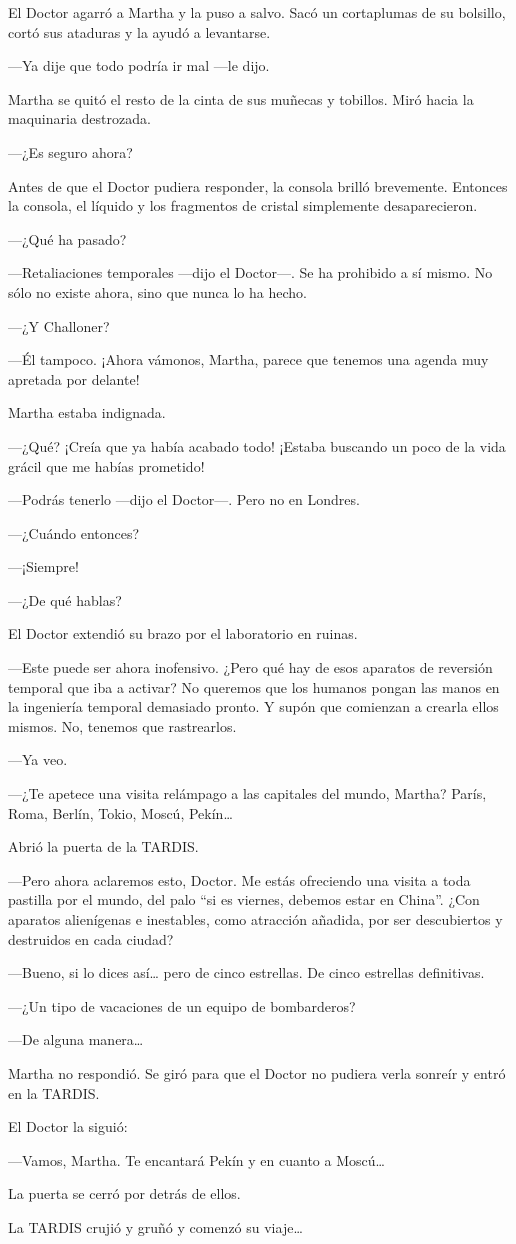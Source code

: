 El Doctor agarró a Martha y la puso a salvo. Sacó un cortaplumas de su
bolsillo, cortó sus ataduras y la ayudó a levantarse.

---Ya dije que todo podría ir mal ---le dijo.

Martha se quitó el resto de la cinta de sus muñecas y tobillos. Miró
hacia la maquinaria destrozada.

---¿Es seguro ahora?

Antes de que el Doctor pudiera responder, la consola brilló brevemente.
Entonces la consola, el líquido y los fragmentos de cristal simplemente
desaparecieron.

---¿Qué ha pasado?

---Retaliaciones temporales ---dijo el Doctor---. Se ha prohibido a sí
mismo. No sólo no existe ahora, sino que nunca lo ha hecho.

---¿Y Challoner?

---Él tampoco. ¡Ahora vámonos, Martha, parece que tenemos una agenda muy
apretada por delante!

Martha estaba indignada.

---¿Qué? ¡Creía que ya había acabado todo! ¡Estaba buscando un poco de
la vida grácil que me habías prometido!

---Podrás tenerlo ---dijo el Doctor---. Pero no en Londres.

---¿Cuándo entonces?

---¡Siempre!

---¿De qué hablas?

El Doctor extendió su brazo por el laboratorio en ruinas.

---Este puede ser ahora inofensivo. ¿Pero qué hay de esos aparatos de
reversión temporal que iba a activar? No queremos que los humanos
pongan las manos en la ingeniería temporal demasiado pronto. Y supón que
comienzan a crearla ellos mismos. No, tenemos que rastrearlos.

---Ya veo.

---¿Te apetece una visita relámpago a las capitales del mundo, Martha?
París, Roma, Berlín, Tokio, Moscú, Pekín\ldots{}

Abrió la puerta de la TARDIS.

---Pero ahora aclaremos esto, Doctor. Me estás ofreciendo una visita a
toda pastilla por el mundo, del palo ``si es viernes, debemos estar en
China''. ¿Con aparatos alienígenas e inestables, como atracción añadida,
por ser descubiertos y destruidos en cada ciudad?

---Bueno, si lo dices así\ldots{} pero de cinco estrellas. De cinco
estrellas definitivas.

---¿Un tipo de vacaciones de un equipo de bombarderos?

---De alguna manera\ldots{}

Martha no respondió. Se giró para que el Doctor no pudiera verla sonreír
y entró en la TARDIS.

El Doctor la siguió:

---Vamos, Martha. Te encantará Pekín y en cuanto a Moscú\ldots{}

La puerta se cerró por detrás de ellos.

La TARDIS crujió y gruñó y comenzó su viaje\ldots{}